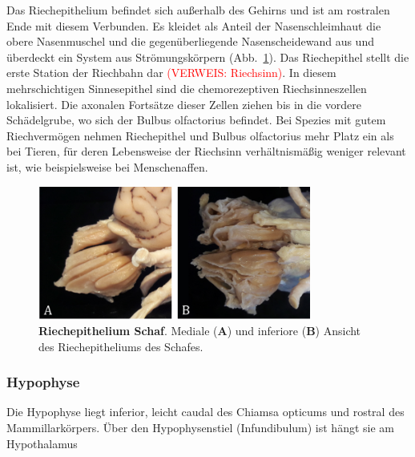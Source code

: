 \documentclass[12pt,a4paper,pdftex]{article}
\begin{document}
Das Riechepithelium befindet sich außerhalb des Gehirns und ist am rostralen Ende mit diesem Verbunden. Es kleidet als Anteil der Nasenschleimhaut die obere Nasenmuschel und die gegenüberliegende Nasenscheidewand aus und überdeckt  ein  System aus Strömungskörpern (Abb.~\ref{fig:Riechepithel}). Das Riechepithel stellt die erste Station der Riechbahn dar \textcolor{red}{(VERWEIS: Riechsinn)}. In diesem mehrschichtigen Sinnesepithel sind die chemorezeptiven Riechsinneszellen lokalisiert. Die axonalen Fortsätze dieser Zellen ziehen bis in die vordere Schädelgrube, wo sich der Bulbus olfactorius befindet. Bei Spezies mit gutem Riechvermögen nehmen Riechepithel und Bulbus olfactorius mehr Platz ein als bei Tieren, für deren Lebensweise der Riechsinn verhältnismäßig weniger relevant ist, wie beispielsweise bei Menschenaffen.

\begin{figure}[H]
    \centering
    \includegraphics[width=0.8\textwidth]{pictures/Bilder_Jule/Schaf/Ausschnitte/Riechepithel.png}
    \caption[Riechepithelium Schaf]{\textbf{Riechepithelium Schaf}. Mediale (\textbf{A}) und inferiore (\textbf{B}) Ansicht des Riechepitheliums des Schafes.}
    \label{fig:Riechepithel}
\end{figure}{}


\subsubsection*{Hypophyse}
\label{subsubsec:hypophyse} 

Die Hypophyse liegt inferior, leicht caudal des Chiamsa opticums und rostral des Mammillarkörpers. Über den Hypophysenstiel (Infundibulum) ist hängt sie am Hypothalamus 
\end{document}
